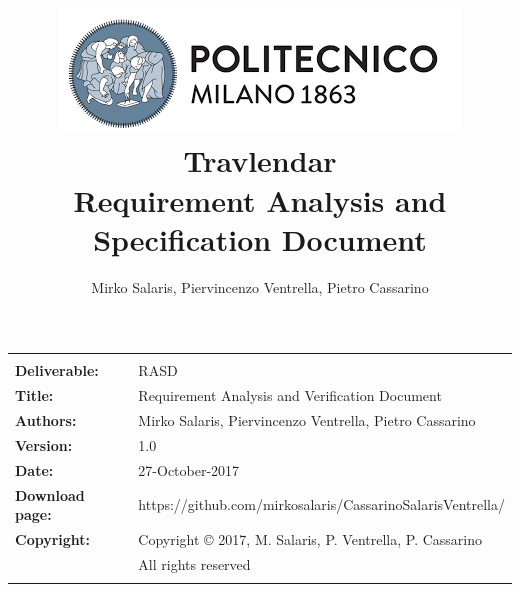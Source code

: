 \documentclass[a4paper]{article}
\begin{document}

\begin{titlepage}

\title{
		\includegraphics[scale=0.5]{Images/PolimiLogo}
		\bigskip
		\Huge{\textbf{\\Travlendar}}\\
		\LARGE{\bigskip Requirement Analysis and Specification Document}
		}
\author{Mirko Salaris, 
		Piervincenzo Ventrella, 
		Pietro Cassarino
}

\maketitle

\end{titlepage}

\begin{table}[h!]
\begin{tabu} to \textwidth { X[0.3,r,p] X[0.7,l,p] }
\hline
\smallskip & \smallskip\\
\textbf{Deliverable:} & RASD\\
\textbf{Title:} & Requirement Analysis and Verification Document \\
\textbf{Authors:} & Mirko Salaris, Piervincenzo Ventrella, Pietro Cassarino \\
\textbf{Version:} & 1.0 \\ 
\textbf{Date:} & 27-October-2017 \\
\textbf{Download page:} & https://github.com/mirkosalaris/CassarinoSalarisVentrella/\\
\textbf{Copyright:} & Copyright © 2017, M. Salaris, P. Ventrella, P. Cassarino\\
\hfill & All rights reserved \\
\smallskip & \smallskip\\
\hline
\end{tabu}
\end{table}
\end{document}
